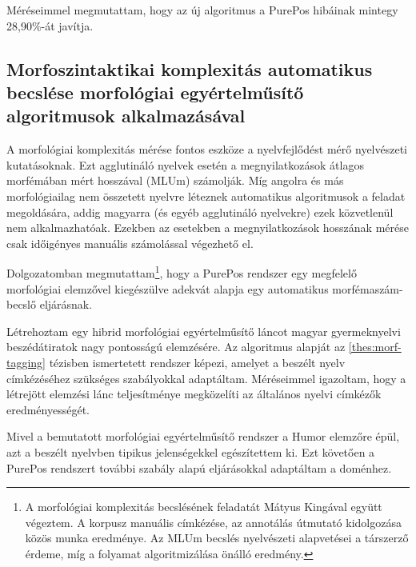 Méréseimmel megmutattam, hogy az új algoritmus a PurePos hibáinak mintegy 28,90\%-át javítja. 

\subsection{Morfoszintaktikai komplexitás automatikus becslése morfológiai egyértelműsítő algoritmusok alkalmazásával}
\label{thes:mlu}

A morfológiai komplexitás mérése fontos eszköze a nyelvfejlődést mérő nyelvészeti kutatásoknak.
Ezt agglutináló nyelvek esetén a megnyilatkozások átlagos morfémában mért hosszával (MLUm) számolják.
Míg angolra és más morfológiailag nem összetett nyelvre léteznek automatikus algoritmusok a feladat megoldására, addig magyarra (és egyéb agglutináló nyelvekre) ezek közvetlenül nem alkalmazhatóak. 
Ezekben az esetekben a megnyilatkozások hosszának mérése csak időigényes manuális számolással végezhető el.

Dolgozatomban megmutattam\footnote{A morfológiai komplexitás becslésének feladatát Mátyus Kingával együtt végeztem. A korpusz manuális címkézése, az annotálás útmutató kidolgozása közös munka eredménye. Az MLUm becslés nyelvészeti alapvetései a társzerző érdeme, míg a folyamat algoritmizálása önálló eredmény.}, hogy a PurePos rendszer egy megfelelő morfológiai elemzővel kiegészülve adekvát alapja egy automatikus morfémaszám-becslő eljárásnak. %

\begin{core}
\begin{thesis}
\label{thes:spoken-morf-tagging}
Létrehoztam egy  hibrid morfológiai egyértelműsítő láncot magyar gyermeknyelvi beszédátiratok nagy pontosságú elemzésére. 
Az algoritmus alapját az \ref{thes:morf-tagging} tézisben ismertetett rendszer képezi, amelyet a beszélt nyelv címkézéséhez szükséges szabályokkal adaptáltam. 
Méréseimmel igazoltam, hogy a létrejött elemzési lánc teljesítménye megközelíti az általános nyelvi címkézők eredményességét.
\end{thesis}

\begin{pub}
\cite{Matyus2014,Orosz2014c}
\end{pub}
\end{core}

Mivel a bemutatott morfológiai egyértelműsítő rendszer a Humor elemzőre épül, azt a beszélt nyelvben tipikus jelenségekkel egészítettem ki. 
Ezt követően a PurePos rendszert további szabály alapú eljárásokkal adaptáltam a doménhez.

